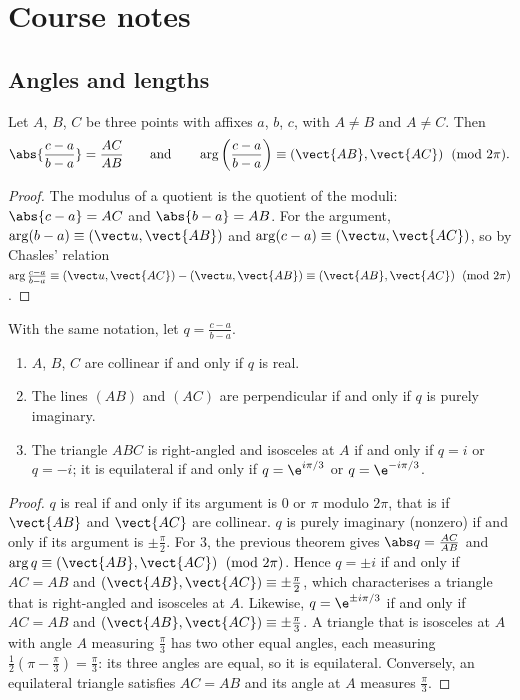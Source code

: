\mxnewpage
\section{Course notes}
\subsection{Angles and lengths}
\begin{theorem}
Let $A$, $B$, $C$ be three points with affixes $a$, $b$, $c$, with $A\neq B$ and $A\neq C$. Then
\[\abs{\frac{c-a}{b-a}}=\frac{AC}{AB}\qquad\text{and}\qquad\arg\left(\frac{c-a}{b-a}\right)\equiv\left(\vect{AB},\vect{AC}\right)\pmod{2\pi}.\]
\end{theorem}
\begin{proof}
The modulus of a quotient is the quotient of the moduli: $\abs{c-a}=AC$ and $\abs{b-a}=AB$. For the argument, $\arg(b-a)\equiv\left(\vect u,\vect{AB}\right)$ and $\arg(c-a)\equiv\left(\vect u,\vect{AC}\right)$, so by Chasles' relation $\arg\frac{c-a}{b-a}\equiv\left(\vect u,\vect{AC}\right)-\left(\vect u,\vect{AB}\right)\equiv\left(\vect{AB},\vect{AC}\right)\pmod{2\pi}$.
\end{proof}
\begin{theorem}
With the same notation, let $q=\frac{c-a}{b-a}$.
\begin{enumerate}
\item $A$, $B$, $C$ are collinear if and only if $q$ is real.
\item The lines $(AB)$ and $(AC)$ are perpendicular if and only if $q$ is purely imaginary.
\item The triangle $ABC$ is right-angled and isosceles at $A$ if and only if $q=i$ or $q=-i$; it is equilateral if and only if $q=\e^{i\pi/3}$ or $q=\e^{-i\pi/3}$.
\end{enumerate}
\end{theorem}
\begin{proof}
$q$ is real if and only if its argument is $0$ or $\pi$ modulo $2\pi$, that is if $\vect{AB}$ and $\vect{AC}$ are collinear. $q$ is purely imaginary (nonzero) if and only if its argument is $\pm\frac\pi2$. For 3, the previous theorem gives $\abs q=\frac{AC}{AB}$ and $\arg q\equiv\left(\vect{AB},\vect{AC}\right)\pmod{2\pi}$. Hence $q=\pm i$ if and only if $AC=AB$ and $\left(\vect{AB},\vect{AC}\right)\equiv\pm\frac\pi2$, which characterises a triangle that is right-angled and isosceles at $A$. Likewise, $q=\e^{\pm i\pi/3}$ if and only if $AC=AB$ and $\left(\vect{AB},\vect{AC}\right)\equiv\pm\frac\pi3$. A triangle that is isosceles at $A$ with angle $A$ measuring $\frac\pi3$ has two other equal angles, each measuring $\frac12\left(\pi-\frac\pi3\right)=\frac\pi3$: its three angles are equal, so it is equilateral. Conversely, an equilateral triangle satisfies $AC=AB$ and its angle at $A$ measures $\frac\pi3$.
\end{proof}
